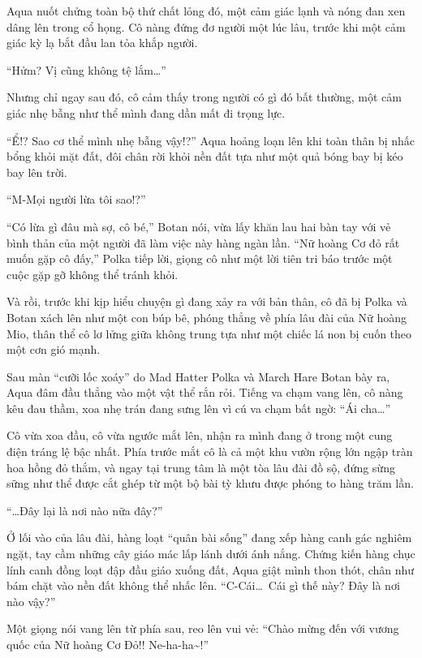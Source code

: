 \documentclass[../main.tex]{subfiles}
\begin{document}
Aqua nuốt chửng toàn bộ thứ chất lỏng đó, một cảm giác lạnh và nóng đan xen dâng lên trong cổ họng. Cô nàng đứng đơ người một lúc lâu, trước khi một cảm giác kỳ lạ bắt đầu lan tỏa khắp người.

``Hửm? Vị cũng không tệ lắm\dots''

Nhưng chỉ ngay sau đó, cô cảm thấy trong người có gì đó bất thường, một cảm giác nhẹ bẫng như thể mình đang dần mất đi trọng lực.

``Ể!? Sao cơ thể mình nhẹ bẫng vậy!?'' Aqua hoảng loạn lên khi toàn thân bị nhấc bổng khỏi mặt đất, đôi chân rời khỏi nền đất tựa như một quả bóng bay bị kéo bay lên trời.

``M-Mọi người lừa tôi sao!?''

``Có lừa gì đâu mà sợ, cô bé,'' Botan nói, vừa lấy khăn lau hai bàn tay với vẻ bình thản của một người đã làm việc này hàng ngàn lần. ``Nữ hoàng Cơ đỏ rất muốn gặp cô đấy,'' Polka tiếp lời, giọng cô như một lời tiên tri báo trước một cuộc gặp gỡ không thể tránh khỏi.

Và rồi, trước khi kịp hiểu chuyện gì đang xảy ra với bản thân, cô đã bị Polka và Botan xách lên như một con búp bê, phóng thẳng về phía lâu đài của Nữ hoàng Mio, thân thể cô lơ lửng giữa không trung tựa như một chiếc lá non bị cuốn theo một cơn gió mạnh.

\ct

Sau màn ``cưỡi lốc xoáy'' do Mad Hatter Polka và March Hare Botan bày ra, Aqua đâm đầu thẳng vào một vật thể rắn rỏi. Tiếng va chạm vang lên, cô nàng kêu đau thầm, xoa nhẹ trán đang sưng lên vì cú va chạm bất ngờ: ``Ái cha\dots''

Cô vừa xoa đầu, cô vừa ngước mắt lên, nhận ra mình đang ở trong một cung điện tráng lệ bậc nhất. Phía trước mắt cô là cả một khu vườn rộng lớn ngập tràn hoa hồng đỏ thắm, và ngay tại trung tâm là một tòa lâu đài đồ sộ, đứng sừng sững như thể được cắt ghép từ một bộ bài tỳ khưu được phóng to hàng trăm lần.

``\dots Đây lại là nơi nào nữa đây?''

Ở lối vào của lâu đài, hàng loạt ``quân bài sống'' đang xếp hàng canh gác nghiêm ngặt, tay cầm những cây giáo mác lấp lánh dưới ánh nắng. Chứng kiến hàng chục lính canh đồng loạt đập đầu giáo xuống đất, Aqua giật mình thon thót, chân như bám chặt vào nền đất không thể nhấc lên. ``C-Cái\dots\ Cái gì thế này? Đây là nơi nào vậy?''

Một giọng nói vang lên từ phía sau, reo lên vui vẻ: ``Chào mừng đến với vương quốc của Nữ hoàng Cơ Đỏ!! Ne-ha-ha\~{}!''
\end{document}
